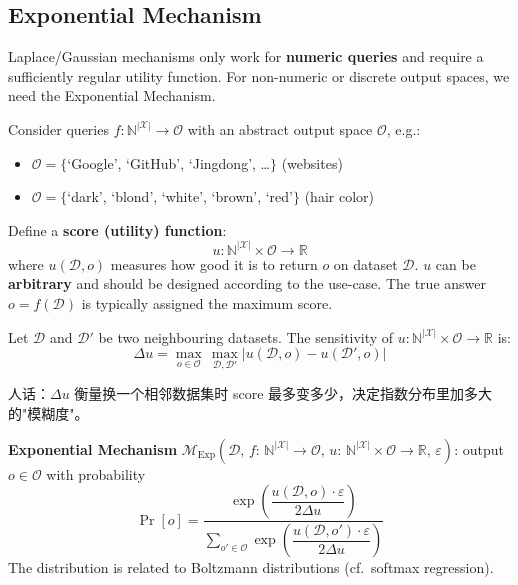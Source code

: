\documentclass[UTF8]{ctexart}
\begin{document}
\subsection{Exponential Mechanism}

Laplace/Gaussian mechanisms only work for \textbf{numeric queries} and require a sufficiently regular utility function. For non-numeric or discrete output spaces, we need the Exponential Mechanism.

Consider queries $f: \mathbb{N}^{|\mathcal{X}|} \to \mathcal{O}$ with an abstract output space $\mathcal{O}$, e.g.:
\begin{itemize}
    \item $\mathcal{O} = \{$`Google', `GitHub', `Jingdong', \ldots$\}$ (websites)
    \item $\mathcal{O} = \{$`dark', `blond', `white', `brown', `red'$\}$ (hair color)
\end{itemize}

Define a \textbf{score (utility) function}:
\[
    u: \mathbb{N}^{|\mathcal{X}|} \times \mathcal{O} \to \mathbb{R}
\]
where $u(\mathcal{D}, o)$ measures how good it is to return $o$ on dataset $\mathcal{D}$. $u$ can be \textbf{arbitrary} and should be designed according to the use-case. The true answer $o = f(\mathcal{D})$ is typically assigned the maximum score.

\begin{mdframed}[linewidth=1.5pt, linecolor=blue!60, backgroundcolor=blue!5,
    frametitle={\textbf{Definition 4 (Sensitivity of score function)}},
    frametitlebackgroundcolor=blue!40, frametitlerule=true]
Let $\mathcal{D}$ and $\mathcal{D}'$ be two neighbouring datasets. The sensitivity of $u: \mathbb{N}^{|\mathcal{X}|} \times \mathcal{O} \to \mathbb{R}$ is:
\[
    \Delta u = \max_{o \in \mathcal{O}}\, \max_{\mathcal{D},\mathcal{D}'} \left| u(\mathcal{D}, o) - u(\mathcal{D}', o) \right|
\]
\end{mdframed}
人话：$\Delta u$ 衡量换一个相邻数据集时 score 最多变多少，决定指数分布里加多大的"模糊度"。

\textbf{Exponential Mechanism} $\mathcal{M}_{\mathrm{Exp}}\!\left(\mathcal{D},\, f{:}\,\mathbb{N}^{|\mathcal{X}|}\to\mathcal{O},\, u{:}\,\mathbb{N}^{|\mathcal{X}|}\times\mathcal{O}\to\mathbb{R},\, \varepsilon\right)$: output $o \in \mathcal{O}$ with probability
\[
    \Pr[o] = \frac{\exp\!\left(\dfrac{u(\mathcal{D},o)\cdot\varepsilon}{2\Delta u}\right)}{\displaystyle\sum_{o'\in\mathcal{O}} \exp\!\left(\dfrac{u(\mathcal{D},o')\cdot\varepsilon}{2\Delta u}\right)}
\]
The distribution is related to Boltzmann distributions (cf.\ softmax regression).
\end{document}
